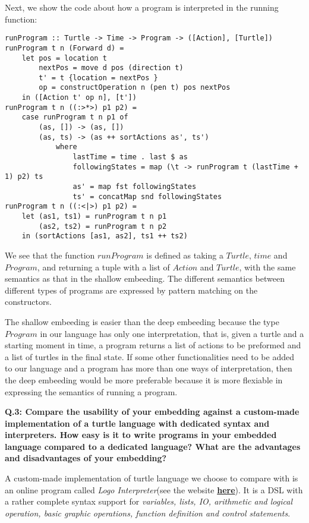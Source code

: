 \documentclass[10pt]{article}
\begin{document}
Next, we show the code about how a program is interpreted in the running function:
\begin{lstlisting}
runProgram :: Turtle -> Time -> Program -> ([Action], [Turtle])
runProgram t n (Forward d) =
    let pos = location t
        nextPos = move d pos (direction t)
        t' = t {location = nextPos }
        op = constructOperation n (pen t) pos nextPos
    in ([Action t' op n], [t'])
runProgram t n ((:>*>) p1 p2) =
    case runProgram t n p1 of
        (as, []) -> (as, [])
        (as, ts) -> (as ++ sortActions as', ts')
            where
                lastTime = time . last $ as
                followingStates = map (\t -> runProgram t (lastTime + 1) p2) ts
                as' = map fst followingStates
                ts' = concatMap snd followingStates
runProgram t n ((:<|>) p1 p2) =
    let (as1, ts1) = runProgram t n p1
        (as2, ts2) = runProgram t n p2
    in (sortActions [as1, as2], ts1 ++ ts2)
\end{lstlisting}
We see that the function $runProgram$ is defined as taking a $Turtle$, $time$ and $Program$, and returning a tuple with a list of $Action$ and $Turtle$, with the same semantics as that in the shallow embeeding. The different semantics between different types of programs are expressed by pattern matching on the constructors.

The shallow embeeding is easier than the deep embeeding because the type $Program$ in our language has only one interpretation, that is, given a turtle and a starting moment in time, a program returns a list of actions to be preformed and a list of turtles in the final state. If some other functionalities need to be added to our language and a program has more than one ways of interpretation, then the deep embeeding would be more preferable because it is more flexiable in expressing the semantics of running a program. 

\textbf{Q.3: Compare the usability of your embedding against a custom-made implementation of a turtle language with dedicated syntax and interpreters. How easy is it to write programs in your embedded language compared to a dedicated language? What are the advantages and disadvantages of your embedding?}

 A custom-made implementation of turtle language we choose to compare with is an online program called \emph{Logo Interpreter}(see the website \href{https://www.calormen.com/jslogo/?lang=en}{\textbf{here}}). It is a DSL with a rather complete syntax support for \textit{variables, lists, IO, arithmetic and logical operation, basic graphic operations, function definition and control statements}.
\end{document}
